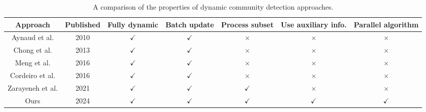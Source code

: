\begin{table*}[hbtp]
  \centering
  \caption{A comparison of the properties of dynamic community detection approaches.}
  \label{tab:compare-properties}
  \begin{tabular}{|c|c||c|c|c|c|c|}
    \toprule
    \textbf{Approach} &
    \textbf{Published} &
    \textbf{Fully dynamic} &
    \textbf{Batch update} &
    \textbf{Process subset} &
    \textbf{Use auxiliary info.} &
    \textbf{Parallel algorithm} \\
    \midrule
    Aynaud et al. \cite{com-aynaud10} & 2010 & $\checkmark$ & $\checkmark$ & $\times$ & $\times$ & $\times$ \\ \hline
    Chong et al. \cite{com-chong13} & 2013 & $\checkmark$ & $\checkmark$ & $\times$ & $\times$ & $\times$ \\ \hline
    Meng et al. \cite{com-meng16} & 2016 & $\checkmark$ & $\checkmark$ & $\times$ & $\times$ & $\times$ \\ \hline
    Cordeiro et al. \cite{com-cordeiro16} & 2016 & $\checkmark$ & $\checkmark$ & $\times$ & $\times$ & $\times$ \\ \hline
    Zarayeneh et al. \cite{com-zarayeneh21} & 2021 & $\checkmark$ & $\checkmark$ & $\checkmark$ & $\times$ & $\times$ \\ \hline
    Ours & 2024 & $\checkmark$ & $\checkmark$ & $\checkmark$ & $\checkmark$ & $\checkmark$ \\ \hline
  \bottomrule
  \end{tabular}
\end{table*}
